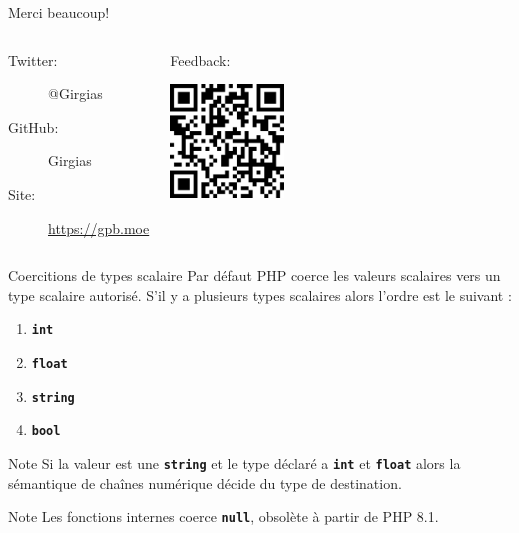 \documentclass[10pt]{beamer}
\newcommand{\type}[1]{\texttt{\textbf{#1}}}
\begin{document}
{
\begin{frame}[standout]
    Merci beaucoup!
    \vfill
    \begin{columns}[T,onlytextwidth]
            \begin{center}
                \begin{description}
                    \item[Twitter:] @Girgias
                    \item[GitHub:] Girgias
                    \item[Site:] \url{https://gpb.moe}
                \end{description}
            \end{center}
            \begin{center}
                Feedback:
                
                \vspace{0.5cm}
                \includegraphics[width=3cm]{images/Forum_PHP_2022_QRCode.png}
            \end{center}
    \end{columns}
\end{frame}
}

\appendix


\begin{frame}[fragile]{Coercitions de types scalaire}
    Par défaut PHP coerce les valeurs scalaires vers un type scalaire autorisé.
    S'il y a plusieurs types scalaires alors l'ordre est le suivant :
    \begin{enumerate}
        \item \type{int}
        \item \type{float}
        \item \type{string}
        \item \type{bool}
    \end{enumerate}
    \begin{exampleblock}{Note}
       Si la valeur est une \type{string} et le type déclaré a \type{int} et \type{float} alors la sémantique de chaînes numérique décide du type de destination.
    \end{exampleblock}
    \begin{exampleblock}{Note}
        Les fonctions internes coerce \type{null}, obsolète à partir de PHP 8.1.
    \end{exampleblock}
\end{frame}
\end{document}
